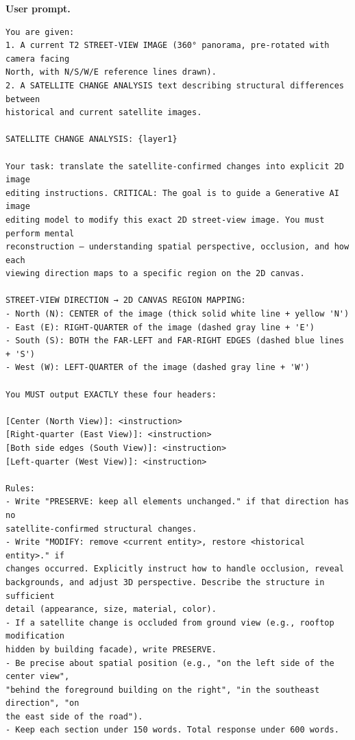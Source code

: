 \noindent\textbf{User prompt.}\par
\begingroup\fontsize{8}{10}\selectfont
\begin{promptbox}
\begin{verbatim}
You are given:
1. A current T2 STREET-VIEW IMAGE (360° panorama, pre-rotated with camera facing
North, with N/S/W/E reference lines drawn).
2. A SATELLITE CHANGE ANALYSIS text describing structural differences between
historical and current satellite images.

SATELLITE CHANGE ANALYSIS: {layer1}

Your task: translate the satellite-confirmed changes into explicit 2D image
editing instructions. CRITICAL: The goal is to guide a Generative AI image
editing model to modify this exact 2D street-view image. You must perform mental
reconstruction — understanding spatial perspective, occlusion, and how each
viewing direction maps to a specific region on the 2D canvas.

STREET-VIEW DIRECTION → 2D CANVAS REGION MAPPING:
- North (N): CENTER of the image (thick solid white line + yellow 'N')
- East (E): RIGHT-QUARTER of the image (dashed gray line + 'E')
- South (S): BOTH the FAR-LEFT and FAR-RIGHT EDGES (dashed blue lines + 'S')
- West (W): LEFT-QUARTER of the image (dashed gray line + 'W')

You MUST output EXACTLY these four headers:

[Center (North View)]: <instruction>
[Right-quarter (East View)]: <instruction>
[Both side edges (South View)]: <instruction>
[Left-quarter (West View)]: <instruction>

Rules:
- Write "PRESERVE: keep all elements unchanged." if that direction has no
satellite-confirmed structural changes.
- Write "MODIFY: remove <current entity>, restore <historical entity>." if
changes occurred. Explicitly instruct how to handle occlusion, reveal
backgrounds, and adjust 3D perspective. Describe the structure in sufficient
detail (appearance, size, material, color).
- If a satellite change is occluded from ground view (e.g., rooftop modification
hidden by building facade), write PRESERVE.
- Be precise about spatial position (e.g., "on the left side of the center view",
"behind the foreground building on the right", "in the southeast direction", "on
the east side of the road").
- Keep each section under 150 words. Total response under 600 words.
\end{verbatim}
\end{promptbox}
\endgroup

